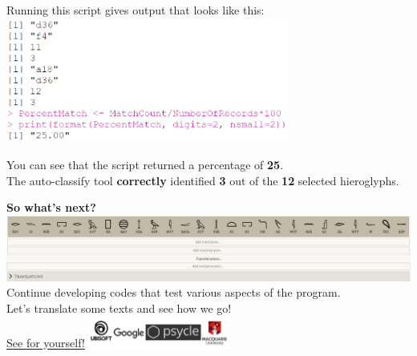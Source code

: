 \documentclass[unknownkeysallowed,usepdftitle=false, parskip=full, aspectratio=169]{beamer}
\newcommand{\secvariable}{nothing}
\newcommand{\mysection}[1]{\renewcommand{\secvariable}{#1}
}
\begin{document}
\begin{frame}\label{\secvariable}

\begin{center}
Running this script gives output that looks like this:
\includegraphics[width=0.7\textwidth,keepaspectratio]{figure/output.PNG}

You can see that the script returned a percentage of \textbf{25}.
\\The auto-classify tool \textbf{correctly} identified \textbf{3} out of the \textbf{12} selected hieroglyphs.
\end{center}

\end{frame}

\mysection{conclusion}

\begin{frame}\label{\secvariable}

\begin{center}

\textbf{So what's next?}
\vfill
\includegraphics[width=1.0\textwidth,keepaspectratio]{figure/translations_2.PNG}
\vfill
Continue developing codes that test various aspects of the program.
\\Let's translate some texts and see how we go!
\\ \href{https://hieroglyphicsinitiative.ubisoft.com/en-GB/home}{See for yourself!}
\vfill
\includegraphics[width=0.35\textwidth,keepaspectratio]{figure/LOGOS.PNG}

\end{center}

\end{frame}
\end{document}
